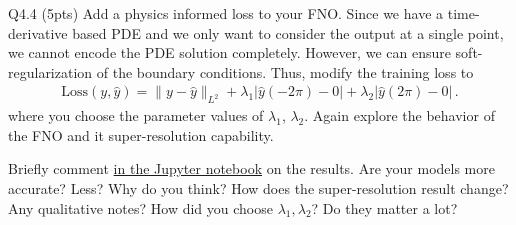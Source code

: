 \documentclass[12pt,letterpaper, onecolumn]{exam}
\theoremstyle{definition}
\begin{document}
\color{orange} Q4.4 (5pts) \color{black} Add a physics informed loss to your FNO. Since we have a time-derivative based PDE and we only want to consider the output at a single point, we cannot encode the PDE solution completely. However, we can ensure soft-regularization of the boundary conditions. Thus, modify the training loss to 
\begin{align*}
    \text{Loss}(y, \hat{y}) = \|y - \hat{y}\|_{L^2} + \lambda_1 |\hat{y}(-2\pi)-0|  + \lambda_2 |\hat{y} (2\pi) -0|\,. 
\end{align*}
where you choose the parameter values of $\lambda_1$, $\lambda_2$. Again explore the behavior of the FNO and it super-resolution capability. 

Briefly comment \underline{in the Jupyter notebook} on the results. Are your models more accurate? Less? Why do you think? How does the super-resolution result change? Any qualitative notes? How did you choose $\lambda_1, \lambda_2$? Do they matter a lot?
\end{document}
